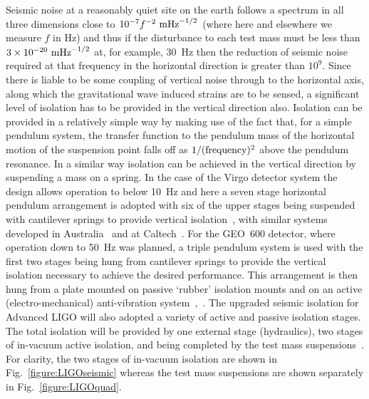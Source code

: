 \documentclass{article}
\begin{document}
Seismic noise at a reasonably quiet site on the earth follows a spectrum in all
three dimensions close to $10^{-7}f^{-2}~{\rm m}{\rm Hz}^{-1/2}$ (where here
and elsewhere we measure $f$ in Hz) and thus if the disturbance to each test
mass must be less than $3 \times 10^{-20}~{\rm m}{\rm Hz}^{-1/2}$ at, for
example, 30~Hz then the reduction of seismic noise required at that frequency in
the horizontal direction is greater than $10^{9}$. Since there is liable to be
some coupling of vertical noise through to the horizontal axis, along which the
gravitational wave induced strains are to be sensed, a significant level of
isolation has to be provided in the vertical direction also. Isolation can be
provided in a relatively simple way by making use of the fact that, for a simple
pendulum system, the transfer function to the pendulum mass of the horizontal
motion of the suspension point falls off as $1/({\rm frequency})^2$ above the
pendulum resonance. In a similar way isolation can be achieved in the vertical
direction by suspending a mass on a spring. In the case of the Virgo detector
system the design allows operation to below 10~Hz and here a seven stage
horizontal pendulum arrangement is adopted with six of the upper stages being
suspended with cantilever springs to provide vertical isolation~\cite{Braccini},
with similar systems developed in Australia~\cite{Ju1} and at
Caltech~\cite{DeSalvo}. For the GEO~600 detector, where operation down to 50~Hz
was planned, a triple pendulum system is used with the first two stages being
hung from cantilever springs to provide the vertical isolation necessary to
achieve the desired performance. This arrangement is then hung from a plate
mounted on passive `rubber' isolation mounts and on an active
(electro-mechanical) anti-vibration system~\cite{Plissi1},~\cite{Torrie}. The
upgraded seismic isolation for Advanced LIGO will also adopted a variety of
active and passive isolation stages. The total isolation will be provided by one
external stage (hydraulics), two stages of in-vacuum active isolation, and being
completed by the test mass suspensions~\cite{Abbott:2002, Harry:2010}. For
clarity, the two stages of in-vacuum isolation are shown in
Fig.~\ref{figure:LIGOseismic} whereas the test mass suspensions are shown
separately in Fig.~\ref{figure:LIGOquad}.

\end{document}

